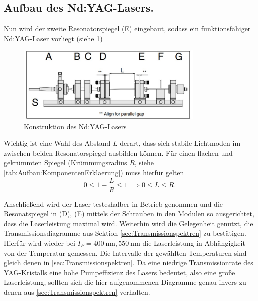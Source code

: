 \documentclass[../main.tex]{subfiles}
\begin{document}
    \subsection{Aufbau des Nd:YAG-Lasers.}\label{sec:Aufbau:NdYAGLaser}
        Nun wird der zweite Resonatorspiegel (E) eingebaut, sodass ein funktionsfähiger Nd:YAG-Laser vorliegt (siehe \ref{fig:Aufbau:Teil4})

        \begin{figure}[H]
            \centering
            \includegraphics[width=0.8\textwidth]{Bilddateien/Versuchsaufbau/Teil4.jpg}
            \caption{Konstruktion des Nd:YAG-Lasers \cite[p.31]{doc:experiment08}}
            \label{fig:Aufbau:Teil4}
        \end{figure}    

        Wichtig ist eine Wahl des Abstand $L$ derart, dass sich stabile Lichtmoden im zwischen beiden Resonatorspiegel ausbilden können. Für einen flachen und gekrümmten Spiegel (Krümmungsradius $R$, siehe \ref{tab:Aufbau:KomponentenErklaerung}) muss hierfür gelten \cite[p.11]{doc:experiment08}
        \[
            0\le 1 - \frac{L}{R}\le 1\implies 0\le L\le R.    
        \]

        Anschließend wird der Laser testeshalber in Betrieb genommen und die Resonatspiegel in (D), (E) mittels der Schrauben in den Modulen so ausgerichtet, dass die Laserleistung maximal wird. Weiterhin wird die Gelegenheit genutzt, die Transmissionsdiagramme aus Sektion \ref{sec:Transmissionspektren} zu bestätigen. Hierfür wird wieder bei $I_P = \SI{400}{\nano\m}, \SI{550}{\nano\m}$ die Laserleistung in Abhängigkeit von der Temperatur gemessen. Die Intervalle der gewählten Temperaturen sind gleich denen in \ref{sec:Transmissionspektren}. Da eine niedrige Transmissionrate des YAG-Kristalls eine hohe Pumpeffizienz des Lasers bedeutet, also eine große Laserleistung, sollten sich die hier aufgenommenen Diagramme genau invers zu denen aus \ref{sec:Transmissionspektren} verhalten.
\end{document}
